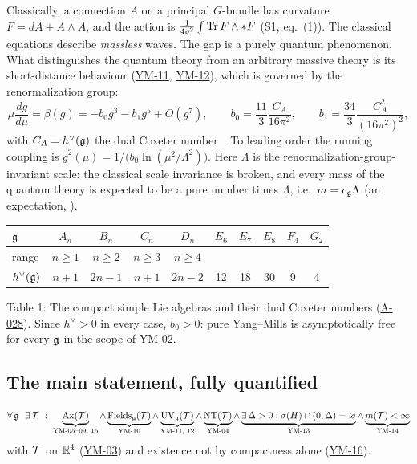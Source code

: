\documentclass[11pt,a4paper]{article}
\newcommand{\idref}[1]{\hyperref[#1]{\textsf{#1}}}
\begin{document}
Classically, a connection $A$ on a principal $G$-bundle has curvature $F=dA+A\wedge A$, and the action is $\frac{1}{4g^2}\int\operatorname{Tr} F\wedge{*F}$ (S1, eq.~(1)). The classical equations describe \emph{massless} waves. The gap is a purely quantum phenomenon. What distinguishes the quantum theory from an arbitrary massive theory is its short-distance behaviour (\idref{YM-11}, \idref{YM-12}), which is governed by the renormalization group:
\[
\mu\frac{d g}{d\mu}=\beta(g)=-b_0g^3-b_1g^5+O(g^7),\qquad
b_0=\frac{11}{3}\frac{C_A}{16\pi^2},\qquad b_1=\frac{34}{3}\frac{C_A^2}{(16\pi^2)^2},
\]
with $C_A=h^\vee(\mathfrak g)$ the dual Coxeter number~\cite{GW73,Pol73,Cas74,Jon74}. To leading order the running coupling is $\bar g^2(\mu)=1/\bigl(b_0\ln(\mu^2/\Lambda^2)\bigr)$. Here $\Lambda$ is the renormalization-group-invariant scale: the classical scale invariance is broken, and every mass of the quantum theory is expected to be a pure number times $\Lambda$, i.e.\ $m=c_\mathfrak g\Lambda$ (an expectation, ).

\begin{center}
\small
\begin{tabular}{@{}lccccccccc@{}}
\toprule
$\mathfrak g$ & $A_n$ & $B_n$ & $C_n$ & $D_n$ & $E_6$ & $E_7$ & $E_8$ & $F_4$ & $G_2$\\
\midrule
range & $n\ge1$ & $n\ge2$ & $n\ge3$ & $n\ge4$ & & & & &\\
$h^\vee(\mathfrak g)$ & $n+1$ & $2n-1$ & $n+1$ & $2n-2$ & 12 & 18 & 30 & 9 & 4\\
\bottomrule
\end{tabular}

\smallskip
Table 1: The compact simple Lie algebras and their dual Coxeter numbers (\idref{A-028}). Since $h^\vee>0$ in every case, $b_0>0$: pure Yang--Mills is asymptotically free for every $\mathfrak g$ in the scope of \idref{YM-02}.
\end{center}

\subsection{The main statement, fully quantified}

\begin{statement}[MAIN]\label{st:main}
\[
\forall\,\g\ \ \exists\,\cT\ :\ \underbrace{\mathrm{Ax}(\cT)}_{\text{YM-05--09, 15}}\wedge\underbrace{\mathrm{Fields}_\g(\cT)}_{\text{YM-10}}\wedge\underbrace{\mathrm{UV}_\g(\cT)}_{\text{YM-11, 12}}\wedge\underbrace{\mathrm{NT}(\cT)}_{\text{YM-04}}\wedge\underbrace{\exists\,\Delta>0:\sigma(H)\cap(0,\Delta)=\varnothing}_{\text{YM-13}}\wedge\underbrace{m(\cT)<\infty}_{\text{YM-14}}
\]
with $\mathcal T$ on $\mathbb R^4$ (\idref{YM-03}) and existence not by compactness alone (\idref{YM-16}).
\end{statement}
\end{document}
